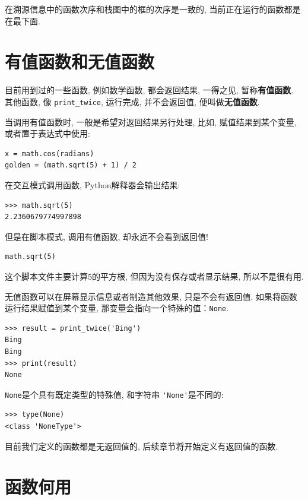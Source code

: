\documentclass[10pt]{book}
\begin{document}
在溯源信息中的函数次序和栈图中的框的次序是一致的, 
当前正在运行的函数都是在最下面. 

\section{有值函数和无值函数}

目前用到过的一些函数, 例如数学函数, 都会返回结果, 
一得之见, 暂称{\bf 有值函数}. 其他函数, 像 \verb"print_twice", 
运行完成, 并不会返回值, 便叫做{\bf 无值函数}. 

当调用有值函数时, 一般是希望对返回结果另行处理, 比如, 
赋值结果到某个变量, 或者置于表达式中使用:

\begin{verbatim}
x = math.cos(radians)
golden = (math.sqrt(5) + 1) / 2
\end{verbatim}
%
在交互模式调用函数, Python解释器会输出结果:

\begin{verbatim}
>>> math.sqrt(5)
2.2360679774997898
\end{verbatim}
%
但是在脚本模式, 调用有值函数, 却永远不会看到返回值!

\begin{verbatim}
math.sqrt(5)
\end{verbatim}
%
这个脚本文件主要计算5的平方根, 但因为没有保存或者显示结果, 所以不是很有用. 

无值函数可以在屏幕显示信息或者制造其他效果, 
只是不会有返回值. 如果将函数运行结果赋值到某个变量, 
那变量会指向一个特殊的值：{\tt None}.

\begin{verbatim}
>>> result = print_twice('Bing')
Bing
Bing
>>> print(result)
None
\end{verbatim}
%
{\tt None}是个具有既定类型的特殊值, 和字符串 \verb"'None'"是不同的:

\begin{verbatim}
>>> type(None)
<class 'NoneType'>
\end{verbatim}
%
目前我们定义的函数都是无返回值的, 后续章节将开始定义有返回值的函数. 


\section{函数何用}
\end{document}
